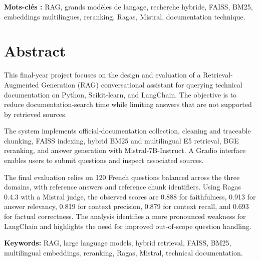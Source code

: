 \documentclass[12pt,a4paper,oneside]{report}
\begin{document}
\medskip
\noindent\textbf{Mots-clés :} RAG, grands modèles de langage, recherche
hybride, FAISS, BM25, embeddings multilingues, reranking, Ragas, Mistral,
documentation technique.

\newpage
\chapter*{Abstract}
\thispagestyle{plain}

This final-year project focuses on the design and evaluation of a
Retrieval-Augmented Generation (RAG) conversational assistant for querying
technical documentation on Python, Scikit-learn, and LangChain. The objective
is to reduce documentation-search time while limiting answers that are not
supported by retrieved sources.

The system implements official-documentation collection, cleaning and
traceable chunking, FAISS indexing, hybrid BM25 and multilingual E5 retrieval,
BGE reranking, and answer generation with Mistral-7B-Instruct. A Gradio
interface enables users to submit questions and inspect associated sources.

The final evaluation relies on 120 French questions balanced across the three
domains, with reference answers and reference chunk identifiers. Using Ragas
0.4.3 with a Mistral judge, the observed scores are 0.888 for faithfulness,
0.913 for answer relevancy, 0.819 for context precision, 0.879 for context
recall, and 0.693 for factual correctness. The analysis identifies a more
pronounced weakness for LangChain and highlights the need for improved
out-of-scope question handling.

\medskip
\noindent\textbf{Keywords:} RAG, large language models, hybrid retrieval,
FAISS, BM25, multilingual embeddings, reranking, Ragas, Mistral, technical
documentation.

\newpage
\tableofcontents
\listoffigures
\listoftables
\newpage
\end{document}

